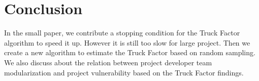 \documentclass[letterpaper,11pt]{texMemo} %
\begin{document}
\section{Conclusion}
In the small paper, we contribute a stopping condition for the Truck Factor algorithm to speed it up. However it is still too slow for large project. Then we create a new algorithm to estimate the Truck Factor based on random sampling. We also discuss about the relation between project developer team modularization and project vulnerability based on the Truck Factor findings.

\end{document}
